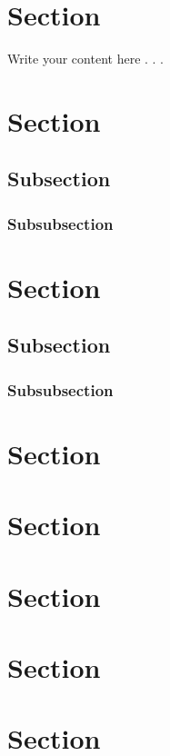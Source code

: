 \documentclass[a4paper,12pt,titlepage]{article}
\begin{document}
	\section{Section}
	Write your content here . . . 
	\section{Section}
	\subsection{Subsection}
	\subsubsection{Subsubsection}
	\section{Section}
	\subsection{Subsection}
	\subsubsection{Subsubsection}
	\section{Section}
	\section{Section}
	\section{Section}
	\section{Section}
	\section{Section}
	
\end{document}
